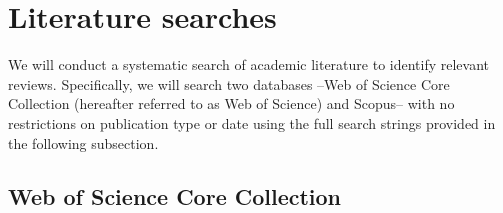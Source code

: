 \documentclass{article}
\begin{document}
\section{Literature searches}

We will conduct a systematic search of academic literature to identify relevant reviews. Specifically, we will search two databases --Web of Science Core Collection (hereafter referred to as Web of Science) and Scopus-- with no restrictions on publication type or date using the full search strings provided in the following subsection.

\subsection{Web of Science Core Collection}




\end{document}
